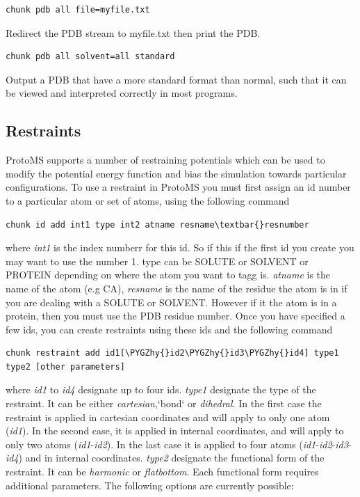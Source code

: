\documentclass[letterpaper,10pt,english]{sphinxmanual}
\def\PYGZhy{\char`\-}
\begin{document}
\begin{Verbatim}[commandchars=\\\{\}]
chunk pdb all file=myfile.txt
\end{Verbatim}

Redirect the PDB stream to myfile.txt then print the PDB.

\begin{Verbatim}[commandchars=\\\{\}]
chunk pdb all solvent=all standard
\end{Verbatim}

Output a PDB that have a more standard format than normal, such that it can be viewed and interpreted correctly in most programs.


\subsection{Restraints}
\label{protoms:restraints}\label{protoms:index-71}
ProtoMS supports a number of restraining potentials which can be used to modify the potential energy function and bias the simulation towards particular configurations. To use a restraint in ProtoMS you must first assign an id number to a particular atom or set of atoms, using the following command

\begin{Verbatim}[commandchars=\\\{\}]
chunk id add int1 type int2 atname resname\textbar{}resnumber
\end{Verbatim}

where \emph{int1} is the index numberr for this id. So if this if the first id you create you may want to use the number 1. type can be SOLUTE or SOLVENT or PROTEIN depending on where the atom you want to tagg is. \emph{atname} is the name of the atom (e.g CA), \emph{resname} is the name of the residue the atom is in if you are dealing with a SOLUTE or SOLVENT. However if it the atom is in a protein, then you must use the PDB residue number.
Once you have specified a few ids, you can create restraints using these ids and the following command

\begin{Verbatim}[commandchars=\\\{\}]
chunk restraint add id1[\PYGZhy{}id2\PYGZhy{}id3\PYGZhy{}id4] type1 type2 [other parameters]
\end{Verbatim}

where \emph{id1} to \emph{id4} designate up to four ids. \emph{type1} designate the type of the restraint. It can be either \emph{cartesian},{}`bond{}` or \emph{dihedral}. In the first case the restraint is applied in cartesian coordinates and will apply to only one atom (\emph{id1}). In the second case, it is applied in internal coordinates, and will apply to only two atoms (\emph{id1}-\emph{id2}). In the last case it is applied to four atoms (\emph{id1}-\emph{id2}-\emph{id3}-\emph{id4}) and in internal coordinates. \emph{type2} designate the functional form of the restraint. It can be \emph{harmonic} or \emph{flatbottom}. Each functional form requires additional parameters. The following options are currently possible:
\end{document}
